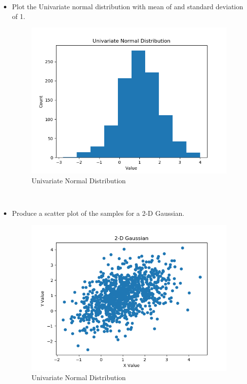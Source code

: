 \documentclass{article}
\begin{document}
\begin{itemize}
\item Plot the Univariate normal distribution with mean of and standard deviation of 1.\\
\begin{figure}[htbp]
	\centering
	\includegraphics[scale = 0.5]{Univariate_distribution.png}
	\caption{Univariate Normal Distribution}
\end{figure}\\
\pagebreak
\item Produce a scatter plot of the samples for a 2-D Gaussian.\\
\begin{figure}[htbp]
	\centering
	\includegraphics[scale = 0.5]{GaussianScatterPlot.png}
	\caption{Univariate Normal Distribution}
\end{figure}\\


\end{itemize}
\end{document}
